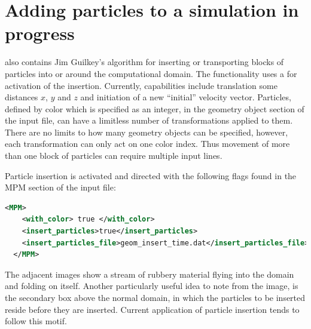 \section{Adding particles to a simulation in progress} \label{Sec:ParticleInsert}
\begin{minipage}[t]{0.6\textwidth}
  \vspace{0pt}
  \Vaango also contains Jim Guilkey's algorithm for inserting or transporting blocks 
  of particles into or around the computational domain.  The functionality uses a 
   for activation of the insertion. Currently, capabilities 
  include translation some distances $x$, $y$ and $z$ and initiation of a new 
  ``initial'' velocity vector.  Particles, defined by color which is specified as an 
  integer, in the geometry object section of the 
  input file, can have a limitless number of transformations applied to them.  
  There are no limits to how many geometry objects can be specified, however,
  each transformation can only act on one color index.  Thus movement of more than
  one block of particles can require multiple input lines.  

  Particle insertion is activated and directed with the following flags found in the 
  MPM section of the input file:
  \begin{lstlisting}[language=XML]
  <MPM>
    <with_color> true </with_color>
    <insert_particles>true</insert_particles>
    <insert_particles_file>geom_insert_time.dat</insert_particles_file>
  </MPM>
  \end{lstlisting}

  The adjacent images show a stream of rubbery material flying into the domain and 
  folding on itself.  Another particularly useful idea to note from the image, is the 
  secondary box above the normal domain, in which the particles to be inserted reside 
  before they are inserted.  Current application of particle insertion tends to follow 
  this motif.
\end{minipage}
\hspace{12pt}
